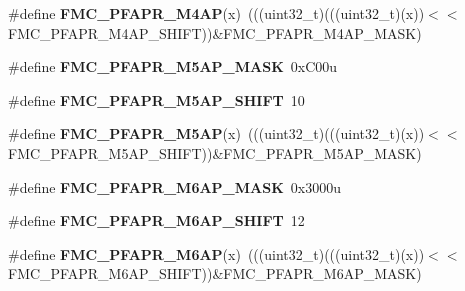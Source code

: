 \begin{DoxyCompactItemize}
\item 
\#define {\bfseries F\+M\+C\+\_\+\+P\+F\+A\+P\+R\+\_\+\+M4\+AP}(x)~(((uint32\+\_\+t)(((uint32\+\_\+t)(x))$<$$<$F\+M\+C\+\_\+\+P\+F\+A\+P\+R\+\_\+\+M4\+A\+P\+\_\+\+S\+H\+I\+FT))\&F\+M\+C\+\_\+\+P\+F\+A\+P\+R\+\_\+\+M4\+A\+P\+\_\+\+M\+A\+SK)\hypertarget{group__FMC__Register__Masks_ga20f0161a402dbe046613f474f38ab1e7}{}\label{group__FMC__Register__Masks_ga20f0161a402dbe046613f474f38ab1e7}

\item 
\#define {\bfseries F\+M\+C\+\_\+\+P\+F\+A\+P\+R\+\_\+\+M5\+A\+P\+\_\+\+M\+A\+SK}~0x\+C00u\hypertarget{group__FMC__Register__Masks_ga85d2b86b0ca3d8a66162fbf7b5394ad7}{}\label{group__FMC__Register__Masks_ga85d2b86b0ca3d8a66162fbf7b5394ad7}

\item 
\#define {\bfseries F\+M\+C\+\_\+\+P\+F\+A\+P\+R\+\_\+\+M5\+A\+P\+\_\+\+S\+H\+I\+FT}~10\hypertarget{group__FMC__Register__Masks_gaf26c0e236405436e3ceb23fa596ce8a5}{}\label{group__FMC__Register__Masks_gaf26c0e236405436e3ceb23fa596ce8a5}

\item 
\#define {\bfseries F\+M\+C\+\_\+\+P\+F\+A\+P\+R\+\_\+\+M5\+AP}(x)~(((uint32\+\_\+t)(((uint32\+\_\+t)(x))$<$$<$F\+M\+C\+\_\+\+P\+F\+A\+P\+R\+\_\+\+M5\+A\+P\+\_\+\+S\+H\+I\+FT))\&F\+M\+C\+\_\+\+P\+F\+A\+P\+R\+\_\+\+M5\+A\+P\+\_\+\+M\+A\+SK)\hypertarget{group__FMC__Register__Masks_ga999fd0b70fe768b1d7171fecf2914776}{}\label{group__FMC__Register__Masks_ga999fd0b70fe768b1d7171fecf2914776}

\item 
\#define {\bfseries F\+M\+C\+\_\+\+P\+F\+A\+P\+R\+\_\+\+M6\+A\+P\+\_\+\+M\+A\+SK}~0x3000u\hypertarget{group__FMC__Register__Masks_gaa369bff90649d5651eec5c6a306b3502}{}\label{group__FMC__Register__Masks_gaa369bff90649d5651eec5c6a306b3502}

\item 
\#define {\bfseries F\+M\+C\+\_\+\+P\+F\+A\+P\+R\+\_\+\+M6\+A\+P\+\_\+\+S\+H\+I\+FT}~12\hypertarget{group__FMC__Register__Masks_ga20c7a1c28737c267b2210e13f7483628}{}\label{group__FMC__Register__Masks_ga20c7a1c28737c267b2210e13f7483628}

\item 
\#define {\bfseries F\+M\+C\+\_\+\+P\+F\+A\+P\+R\+\_\+\+M6\+AP}(x)~(((uint32\+\_\+t)(((uint32\+\_\+t)(x))$<$$<$F\+M\+C\+\_\+\+P\+F\+A\+P\+R\+\_\+\+M6\+A\+P\+\_\+\+S\+H\+I\+FT))\&F\+M\+C\+\_\+\+P\+F\+A\+P\+R\+\_\+\+M6\+A\+P\+\_\+\+M\+A\+SK)\hypertarget{group__FMC__Register__Masks_ga3b0984be7cff1cbfc30c8c9fe2402b9b}{}\label{group__FMC__Register__Masks_ga3b0984be7cff1cbfc30c8c9fe2402b9b}


\end{DoxyCompactItemize}
